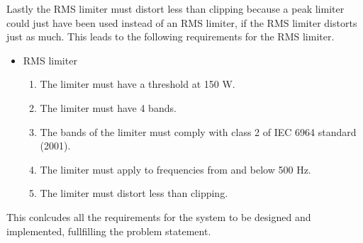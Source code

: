 Lastly the RMS limiter must distort less than clipping because a peak limiter could just have been used instead of an RMS limiter, if the RMS limiter distorts just as much. This leads to the following requirements for the RMS limiter.     

\begin{itemize}
\item RMS limiter
\begin{enumerate}
\item [\textlabel{10}{Threshold}] The limiter must have a threshold at 150 W.\\
\item [\textlabel{11}{bands}] The limiter must have 4 bands.\\
\item [\textlabel{12}{standardband}] The bands of the limiter must comply with class 2 of IEC 6964 standard (2001).\\
\item [\textlabel{13}{500below}] The limiter must apply to frequencies from and below 500 Hz.\\
\item [\textlabel{14}{clipping}] The limiter must distort less than clipping.
\end{enumerate}
\end{itemize}

This conlcudes all the requirements for the system to be designed and implemented, fullfilling the problem statement. 



